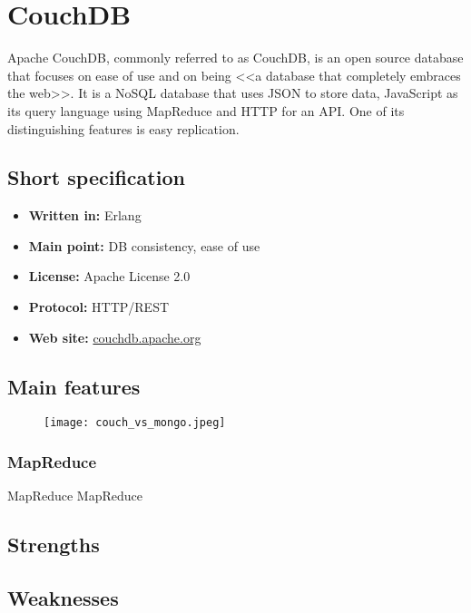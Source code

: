\chapter{CouchDB}

Apache CouchDB, commonly referred to as CouchDB, is an open source database that focuses on ease of use and on being <<a database that completely embraces the web>>. It is a NoSQL database that uses JSON to store data, JavaScript as its query language using MapReduce and HTTP for an API. One of its distinguishing features is easy replication.

\section{Short specification}

\begin{itemize}
  \item \textbf{Written in:} Erlang
  \item \textbf{Main point:} DB consistency, ease of use
  \item \textbf{License:} Apache License 2.0
  \item \textbf{Protocol:} HTTP/REST
  \item \textbf{Web site:} \href{http://couchdb.apache.org/}{couchdb.apache.org}
\end{itemize}

\section{Main features}

\begin{figure}[hb]
  \centering
  \texttt{[image: couch\_vs\_mongo.jpeg]}
\end{figure}

\subsection{MapReduce}

MapReduce MapReduce

\section{Strengths}


\section{Weaknesses}


